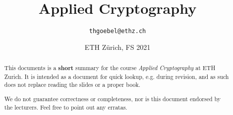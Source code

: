 \documentclass[paper=a4, parskip=half-]{scrartcl}
\title{Applied Cryptography}
\author{\texttt{thgoebel@ethz.ch}}
\date{ETH Zürich, FS 2021}
\begin{document}
\begin{titlepage}
\maketitle
\vspace{5cm}
\thispagestyle{empty}


\begin{abstract}
This documents is a \textbf{short} summary for the course \textit{Applied Cryptography} at ETH Zurich.
It is intended as a document for quick lookup, e.g. during revision, and as such does not replace reading the slides or a proper book.

We do not guarantee correctness or completeness, nor is this document endorsed by the lecturers.
Feel free to point out any erratas.
\end{abstract}

\end{titlepage}

\tableofcontents
\listoffigures
\newpage


\newpage

% 
\end{document}
